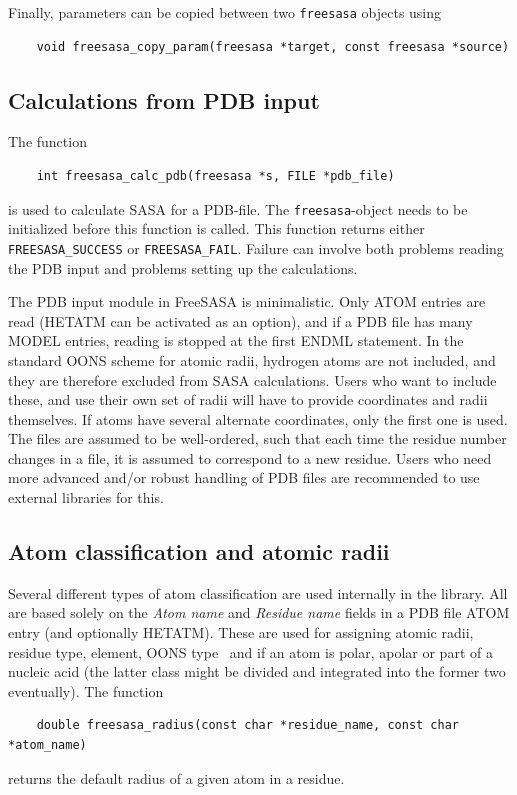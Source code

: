 \documentclass[a4paper,11pt]{article}
\begin{document}
Finally, parameters can be copied between two \verb|freesasa| objects
using
\begin{verbatim}
    void freesasa_copy_param(freesasa *target, const freesasa *source)
\end{verbatim}

\subsection{Calculations from PDB input}

The function 
\begin{verbatim}
    int freesasa_calc_pdb(freesasa *s, FILE *pdb_file)
\end{verbatim}
is used to calculate SASA for a PDB-file. The \verb|freesasa|-object
needs to be initialized before this function is called. This function
returns either \verb|FREESASA_SUCCESS| or \verb|FREESASA_FAIL|.
Failure can involve both problems reading the PDB input and problems
setting up the calculations.

The PDB input module in FreeSASA is minimalistic. Only ATOM entries
are read (HETATM can be activated as an option),
 and if a PDB file has many MODEL entries, reading is stopped
at the first ENDML statement. In the standard OONS scheme for atomic
radii, hydrogen atoms are not included, and they are therefore
excluded from SASA calculations. Users who want to include these, and
use their own set of radii will have to provide coordinates and radii
themselves. If atoms have several alternate coordinates, only the
first one is used. The files are assumed to be well-ordered, such that
each time the residue number changes in a file, it is assumed to
correspond to a new residue. Users who need more advanced and/or
robust handling of PDB files are recommended to use external libraries
for this.

\subsection{Atom classification and atomic radii}

Several different types of atom classification are used internally in
the library. All are based solely on the \emph{Atom name} and
\emph{Residue name} fields in a PDB file ATOM entry (and optionally
HETATM). These are used for assigning atomic radii, residue type,
element, OONS type~\cite{OONS} and if an atom is polar, apolar or part
of a nucleic acid (the latter class might be divided and integrated
into the former two eventually). The function
\begin{verbatim}
    double freesasa_radius(const char *residue_name, const char *atom_name)
\end{verbatim}
returns the default radius of a given atom in a residue.
\end{document}
